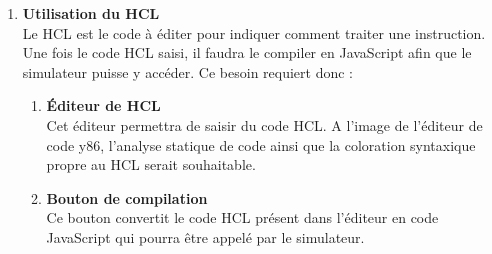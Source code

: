 \documentclass[french]{article}
\newcommand{\itembf}[1]{\item \textbf{#1}\\}
\begin{document}
\begin{enumerate}
\begin{enumerate}
\begin{enumerate}
            \itembf{Utilisation du HCL}
            Le HCL est le code à éditer pour indiquer comment traiter une instruction. Une fois le code HCL saisi, il faudra le compiler en JavaScript afin que le simulateur puisse y accéder. Ce besoin requiert donc :
            \begin{enumerate}
                \itembf{Éditeur de HCL}
                Cet éditeur permettra de saisir du code HCL. A l'image de l'éditeur de code y86, l'analyse statique de code ainsi que la coloration syntaxique propre au HCL serait souhaitable.
                
                \itembf{Bouton de compilation}
                Ce bouton convertit le code HCL présent dans l'éditeur en code JavaScript qui pourra être appelé par le simulateur. 
            \end{enumerate}
        \end{enumerate}
    \end{enumerate}
\end{enumerate}
\end{document}
